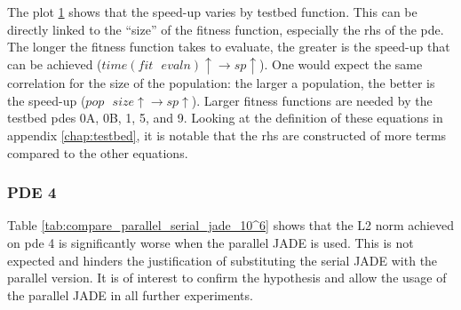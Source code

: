 \documentclass[./\jobname.tex]{subfiles}
\begin{document}
\begin{figure}[H]
	\centering
	\noindent{}
	\label{fig:serial_to_parallel_speedup}
\end{figure}

The plot \ref{fig:serial_to_parallel_speedup} shows that the speed-up varies by testbed function. This can be directly linked to the ``size'' of the fitness function, especially the \gls{rhs} of the \gls{pde}. The longer the fitness function takes to evaluate, the greater is the speed-up that can be achieved ($time(fit \text{ } evaln) \uparrow \rightarrow sp \uparrow$). One would expect the same correlation for the size of the population: the larger a population, the better is the speed-up ($pop \text{ } size \uparrow \rightarrow sp \uparrow$). Larger fitness functions are needed by the testbed \gls{pde}s 0A, 0B, 1, 5, and 9. Looking at the definition of these equations in appendix \ref{chap:testbed}, it is notable that the \gls{rhs} are constructed of more terms compared to the other equations. 

\subsubsection{PDE 4}

Table \ref{tab:compare_parallel_serial_jade_10^6} shows that the L2 norm achieved on \gls{pde} 4 is significantly worse when the parallel JADE is used. This is not expected and hinders the justification of substituting the serial JADE with the parallel version. It is of interest to confirm the hypothesis and allow the usage of the parallel JADE in all further experiments. 
\end{document}
